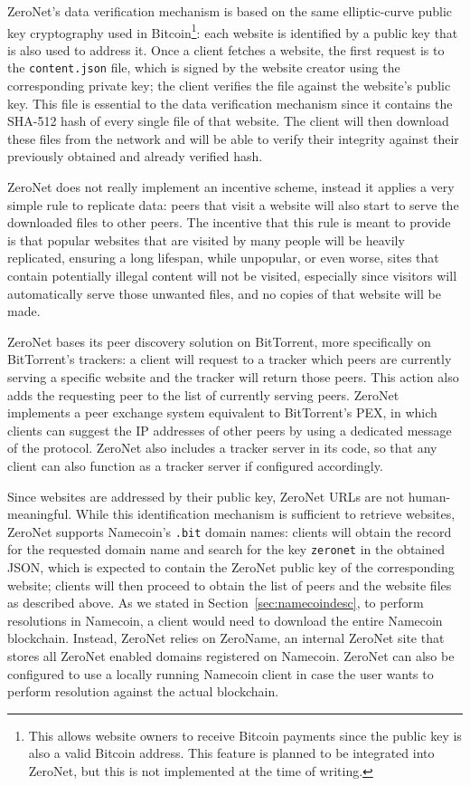 \documentclass[mscthesis]{usiinfthesis}
\begin{document}
ZeroNet's data verification mechanism is based on the same elliptic-curve public key cryptography used in Bitcoin\footnote{This allows website owners to receive Bitcoin payments since the public key is also a valid Bitcoin address. This feature is planned to be integrated into ZeroNet, but this is not implemented at the time of writing.}: each website is identified by a public key that is also used to address it. Once a client fetches a website, the first request is to the \texttt{content.json} file, which is signed by the website creator using the corresponding private key; the client verifies the file against the website's public key. This file is essential to the data verification mechanism since it contains the SHA-512 hash of every single file of that website. The client will then download these files from the network and will be able to verify their integrity against their previously obtained and already verified hash.

ZeroNet does not really implement an incentive scheme, instead it applies a very simple rule to replicate data: peers that visit a website will also start to serve the downloaded files to other peers. The incentive that this rule is meant to provide is that popular websites that are visited by many people will be heavily replicated, ensuring a long lifespan, while unpopular, or even worse, sites that contain potentially illegal content will not be visited, especially since visitors will automatically serve those unwanted files, and no copies of that website will be made.

ZeroNet bases its peer discovery solution on BitTorrent, more specifically on BitTorrent's trackers: a client will request to a tracker which peers are currently serving a specific website and the tracker will return those peers. This action also adds the requesting peer to the list of currently serving peers. ZeroNet implements a peer exchange system equivalent to BitTorrent's PEX, in which clients can suggest the IP addresses of other peers by using a dedicated message of the protocol. ZeroNet also includes a tracker server in its code, so that any client can also function as a tracker server if configured accordingly.

Since websites are addressed by their public key, ZeroNet URLs are not human-meaningful. While this identification mechanism is sufficient to retrieve websites, ZeroNet supports Namecoin's \texttt{.bit} domain names: clients will obtain the record for the requested domain name and search for the key \texttt{zeronet} in the obtained JSON, which is expected to contain the ZeroNet public key of the corresponding website; clients will then proceed to obtain the list of peers and the website files as described above. As we stated in Section~\ref{sec:namecoindesc}, to perform resolutions in Namecoin, a client would need to download the entire Namecoin blockchain. Instead, ZeroNet relies on ZeroName, an internal ZeroNet site that stores all ZeroNet enabled domains registered on Namecoin. ZeroNet can also be configured to use a locally running Namecoin client in case the user wants to perform resolution against the actual blockchain.
\end{document}
